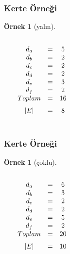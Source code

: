 \documentclass[dvipsnames]{beamer}
\theoremstyle{definition}
\theoremstyle{example}
\newtheorem{ornek}[theorem]{Örnek}
\theoremstyle{plain}
\begin{document}
\begin{frame}
  \frametitle{Kerte Örneği}

  \begin{ornek}[yalın]
    \begin{columns}
      \begin{center}
      \end{center}

        $\begin{array}{ccc}
        d_a & = & 5\\
        d_b & = & 2\\
        d_c & = & 2\\
        d_d & = & 2\\
        d_e & = & 3\\
        d_f & = & 2\\
        \medskip
        Toplam & = & 16\\
        \medskip
        |E| & = & 8
        \end{array}$
    \end{columns}
  \end{ornek}
\end{frame}

\begin{frame}
  \frametitle{Kerte Örneği}

  \begin{ornek}[çoklu]
    \begin{columns}
      \begin{center}
      \end{center}

        $\begin{array}{ccc}
        d_a & = & 6\\
        d_b & = & 3\\
        d_c & = & 2\\
        d_d & = & 2\\
        d_e & = & 5\\
        d_f & = & 2\\
        \medskip
        Toplam & = & 20\\
        \medskip
        |E| & = & 10
        \end{array}$
    \end{columns}
  \end{ornek}
\end{frame}
\end{document}
